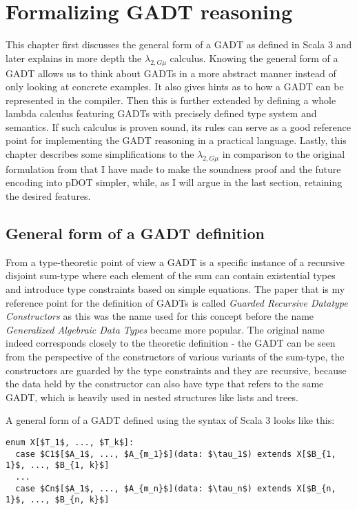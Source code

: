 \chapter{Formalizing GADT reasoning}

This chapter first discusses the general form of a GADT as defined in Scala 3 and later explains in more depth the $\lambda_{2,G\mu}$ calculus.
Knowing the general form of a GADT allows us to think about GADTs in a more abstract manner instead of only looking at concrete examples. It also gives hints as to how a GADT can be represented in the compiler. Then this is further extended by defining a whole lambda calculus featuring GADTs with precisely defined type system and semantics. If such calculus is proven sound, its rules can serve as a good reference point for implementing the GADT reasoning in a practical language. Lastly, this chapter describes some simplifications to the $\lambda_{2,G\mu}$ in comparison to the original formulation from \cite{XiGRDT} that I have made to make the soundness proof and the future encoding into pDOT simpler, while, as I will argue in the last section, retaining the desired features.

\section{General form of a GADT definition}

From a type-theoretic point of view a GADT is a specific instance of a recursive disjoint sum-type where each element of the sum can contain existential types and introduce type constraints based on simple equations. The paper that is my reference point for the definition of GADTs is called \textit{Guarded Recursive Datatype Constructors} \cite{XiGRDT} as this was the name used for this concept before the name \textit{Generalized Algebraic Data Types} became more popular. The original name indeed corresponds closely to the theoretic definition - the GADT can be seen from the perspective of the constructors of various variants of the sum-type, the constructors are guarded by the type constraints and they are recursive, because the data held by the constructor can also have type that refers to the same GADT, which is heavily used in nested structures like lists and trees.

A general form of a GADT defined using the syntax of Scala 3 looks like this:

\begin{lstlisting}[mathescape=true, basicstyle=\ttfamily]
enum X[$T_1$, ..., $T_k$]:
  case $C1$[$A_1$, ..., $A_{m_1}$](data: $\tau_1$) extends X[$B_{1, 1}$, ..., $B_{1, k}$]
  ...
  case $Cn$[$A_1$, ..., $A_{m_n}$](data: $\tau_n$) extends X[$B_{n, 1}$, ..., $B_{n, k}$]
\end{lstlisting}

